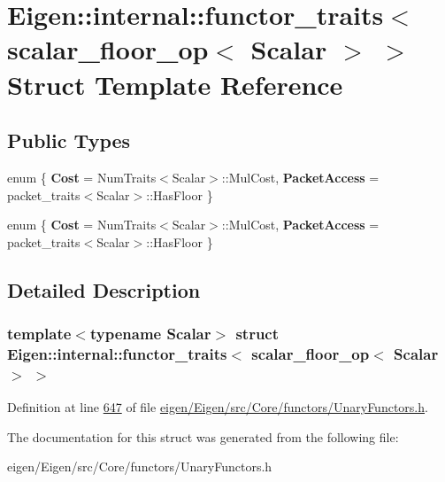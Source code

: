 \hypertarget{struct_eigen_1_1internal_1_1functor__traits_3_01scalar__floor__op_3_01_scalar_01_4_01_4}{}\section{Eigen\+:\+:internal\+:\+:functor\+\_\+traits$<$ scalar\+\_\+floor\+\_\+op$<$ Scalar $>$ $>$ Struct Template Reference}
\label{struct_eigen_1_1internal_1_1functor__traits_3_01scalar__floor__op_3_01_scalar_01_4_01_4}
\subsection*{Public Types}
\begin{DoxyCompactItemize}
\item 
\mbox{\label{struct_eigen_1_1internal_1_1functor__traits_3_01scalar__floor__op_3_01_scalar_01_4_01_4_a066dce674a394379f7c85459925147b7}} 
enum \{ {\bfseries Cost} = Num\+Traits$<$Scalar$>$\+:\+:Mul\+Cost, 
{\bfseries Packet\+Access} = packet\+\_\+traits$<$Scalar$>$\+:\+:Has\+Floor
 \}
\item 
\mbox{\label{struct_eigen_1_1internal_1_1functor__traits_3_01scalar__floor__op_3_01_scalar_01_4_01_4_a56897499a675e3fa108f021385e021f2}} 
enum \{ {\bfseries Cost} = Num\+Traits$<$Scalar$>$\+:\+:Mul\+Cost, 
{\bfseries Packet\+Access} = packet\+\_\+traits$<$Scalar$>$\+:\+:Has\+Floor
 \}
\end{DoxyCompactItemize}


\subsection{Detailed Description}
\subsubsection*{template$<$typename Scalar$>$\newline
struct Eigen\+::internal\+::functor\+\_\+traits$<$ scalar\+\_\+floor\+\_\+op$<$ Scalar $>$ $>$}



Definition at line \hyperlink{eigen_2_eigen_2src_2_core_2functors_2_unary_functors_8h_source_l00647}{647} of file \hyperlink{eigen_2_eigen_2src_2_core_2functors_2_unary_functors_8h_source}{eigen/\+Eigen/src/\+Core/functors/\+Unary\+Functors.\+h}.



The documentation for this struct was generated from the following file\+:\begin{DoxyCompactItemize}
\item 
eigen/\+Eigen/src/\+Core/functors/\+Unary\+Functors.\+h\end{DoxyCompactItemize}
